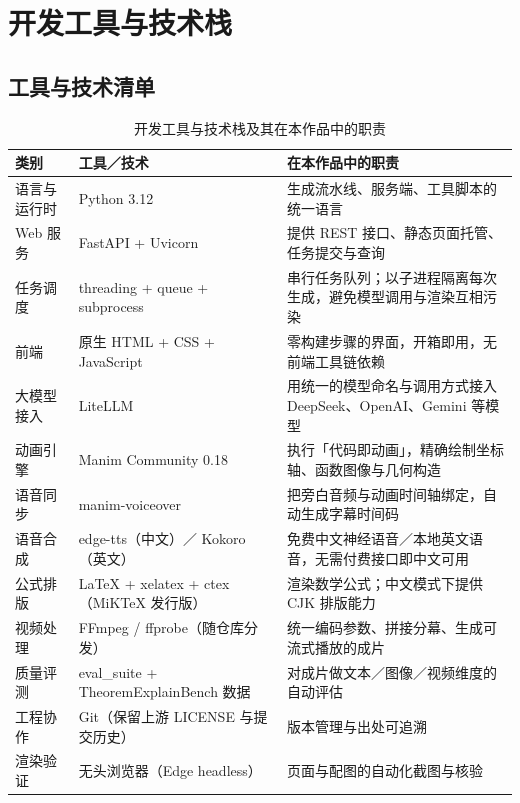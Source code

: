 \documentclass[11pt,a4paper]{ctexart}
\begin{document}
\section{开发工具与技术栈}

\subsection{工具与技术清单}

\begin{table}[htbp]
\centering
\small
\caption{开发工具与技术栈及其在本作品中的职责}
\begin{tabularx}{\textwidth}{@{}p{2.7cm} p{3.5cm} X@{}}
\toprule
\textbf{类别} & \textbf{工具／技术} & \textbf{在本作品中的职责} \\
\midrule
语言与运行时 & Python 3.12 & 生成流水线、服务端、工具脚本的统一语言 \\
Web 服务 & FastAPI + Uvicorn & 提供 REST 接口、静态页面托管、任务提交与查询 \\
任务调度 & threading + queue + subprocess & 串行任务队列；以子进程隔离每次生成，避免模型调用与渲染互相污染 \\
前端 & 原生 HTML + CSS + JavaScript & 零构建步骤的界面，开箱即用，无前端工具链依赖 \\
大模型接入 & LiteLLM & 用统一的模型命名与调用方式接入 DeepSeek、OpenAI、Gemini 等模型 \\
动画引擎 & Manim Community 0.18 & 执行「代码即动画」，精确绘制坐标轴、函数图像与几何构造 \\
语音同步 & manim-voiceover & 把旁白音频与动画时间轴绑定，自动生成字幕时间码 \\
语音合成 & edge-tts（中文）／ Kokoro（英文） & 免费中文神经语音／本地英文语音，无需付费接口即中文可用 \\
公式排版 & LaTeX + xelatex + ctex（MiKTeX 发行版） & 渲染数学公式；中文模式下提供 CJK 排版能力 \\
视频处理 & FFmpeg / ffprobe（随仓库分发） & 统一编码参数、拼接分幕、生成可流式播放的成片 \\
质量评测 & eval\_suite + TheoremExplainBench 数据 & 对成片做文本／图像／视频维度的自动评估 \\
工程协作 & Git（保留上游 LICENSE 与提交历史） & 版本管理与出处可追溯 \\
渲染验证 & 无头浏览器（Edge headless） & 页面与配图的自动化截图与核验 \\
\bottomrule
\end{tabularx}
\end{table}
\end{document}
